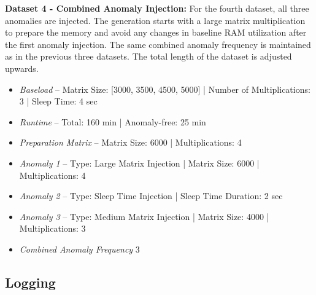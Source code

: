 \documentclass[12pt,oneside]{article}
\begin{document}
\textbf{Dataset 4 - Combined Anomaly Injection:} For the fourth dataset, all three anomalies are injected. The generation starts with a large matrix multiplication to prepare the memory and avoid any changes in baseline RAM utilization after the first anomaly injection. The same combined anomaly frequency is maintained as in the previous three datasets. The total length of the dataset is adjusted upwards. 
\begin{itemize}
    \item \textit{Baseload} -- Matrix Size: [3000, 3500, 4500, 5000] | Number of Multiplications: 3 | Sleep Time: 4 sec
    \item \textit{Runtime} -- Total: 160 min | Anomaly-free: 25 min 
    \item \textit{Preparation Matrix} -- Matrix Size: 6000 | Multiplications: 4
    \item \textit{Anomaly 1} -- Type: Large Matrix Injection | Matrix Size: 6000 | Multiplications: 4
    \item \textit{Anomaly 2} -- Type: Sleep Time Injection | Sleep Time Duration: 2 sec
    \item \textit{Anomaly 3} -- Type: Medium Matrix Injection | Matrix Size: 4000 | Multiplications: 3 
    \item \textit{Combined Anomaly Frequency} 3
\end{itemize}

\subsection{Logging}
\end{document}
